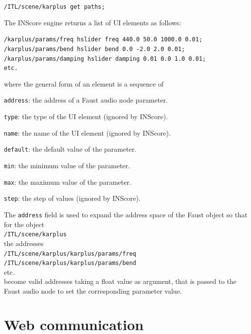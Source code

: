 \documentclass{article}
\newcommand{\ispace}	{\setlength\itemsep{0mm}}
\newcommand{\icode}[1]	{{\small \texttt{#1}}}
\newcommand{\code}[1]	{\vspace{-1em}\begin{center}\colorbox{mygrey}{\begin{minipage}[t]{0.98\columnwidth} {\scriptsize \texttt{#1}}\end{minipage}}\end{center}}
\begin{document}
\code{/ITL/scene/karplus get paths;}

The INScore engine returns a list of UI elements as follows:
\code{/karplus/params/freq hslider freq 440.0 50.0 1000.0 0.01;\\
/karplus/params/bend hslider bend 0.0 -2.0 2.0 0.01;\\
/karplus/params/damping hslider damping 0.01 0.0 1.0 0.01;\\
etc.}
where the general form of an element is a sequence of
\begin{description}
\ispace
\item[] \icode{address}: the address of a Faust audio node parameter.
\item[] \icode{type}: the type of the UI element (ignored by INScore).
\item[] \icode{name}: the name of the UI element (ignored by INScore).
\item[] \icode{default}: the default value of the parameter.
\item[] \icode{min}: the minimum value of the parameter.
\item[] \icode{max}: the maximum value of the parameter.
\item[] \icode{step}: the step of values (ignored by INScore).
\end{description}

The \icode{address} field is used to expand the address space of the Faust object so that for the object \\
\icode{/ITL/scene/karplus}\\
 the addresses\\
\icode{/ITL/scene/karplus/karplus/params/freq} \\
\icode{/ITL/scene/karplus/karplus/params/bend} \\
etc. \\
become valid addresses taking a float value as argument, that is passed to the Faust audio node to set the corresponding parameter value. 


\section{Web communication}\label{sec:comm}

\end{document}
